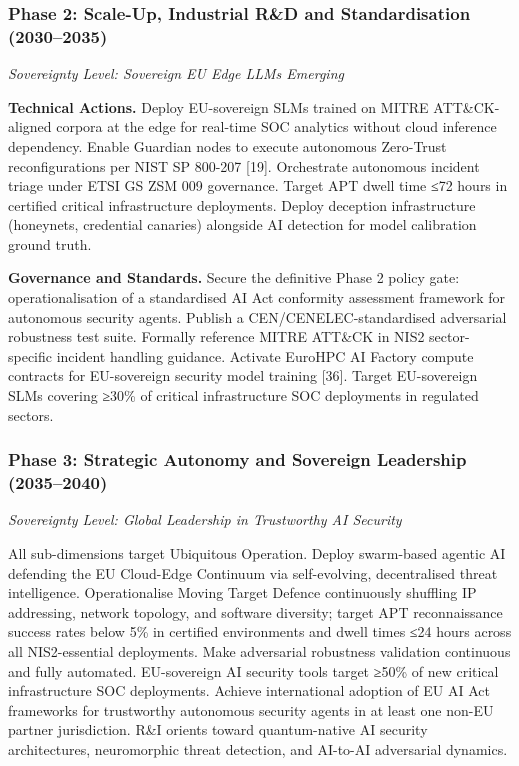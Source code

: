 \documentclass{ieeeaccess}
\begin{document}
\subsubsection{Phase 2: Scale-Up, Industrial R\&D and Standardisation
(2030--2035)}\label{phase-2-scale-up-industrial-rd-and-standardisation-20302035-1}

\emph{Sovereignty Level: Sovereign EU Edge LLMs Emerging}

\textbf{Technical Actions.} Deploy EU-sovereign SLMs trained on MITRE
ATT\&CK-aligned corpora at the edge for real-time SOC analytics without
cloud inference dependency. Enable Guardian nodes to execute autonomous
Zero-Trust reconfigurations per NIST SP 800-207 {[}19{]}. Orchestrate
autonomous incident triage under ETSI GS ZSM 009 governance. Target APT
dwell time ≤72 hours in certified critical infrastructure deployments.
Deploy deception infrastructure (honeynets, credential canaries)
alongside AI detection for model calibration ground truth.

\textbf{Governance and Standards.} Secure the definitive Phase 2 policy
gate: operationalisation of a standardised AI Act conformity assessment
framework for autonomous security agents. Publish a
CEN/CENELEC-standardised adversarial robustness test suite. Formally
reference MITRE ATT\&CK in NIS2 sector-specific incident handling
guidance. Activate EuroHPC AI Factory compute contracts for EU-sovereign
security model training {[}36{]}. Target EU-sovereign SLMs covering
≥30\% of critical infrastructure SOC deployments in regulated sectors.

\subsubsection{Phase 3: Strategic Autonomy and Sovereign Leadership
(2035--2040)}\label{phase-3-strategic-autonomy-and-sovereign-leadership-20352040-1}

\emph{Sovereignty Level: Global Leadership in Trustworthy AI Security}

All sub-dimensions target Ubiquitous Operation. Deploy swarm-based
agentic AI defending the EU Cloud-Edge Continuum via self-evolving,
decentralised threat intelligence. Operationalise Moving Target Defence
continuously shuffling IP addressing, network topology, and software
diversity; target APT reconnaissance success rates below 5\% in
certified environments and dwell times ≤24 hours across all
NIS2-essential deployments. Make adversarial robustness validation
continuous and fully automated. EU-sovereign AI security tools target
≥50\% of new critical infrastructure SOC deployments. Achieve
international adoption of EU AI Act frameworks for trustworthy
autonomous security agents in at least one non-EU partner jurisdiction.
R\&I orients toward quantum-native AI security architectures,
neuromorphic threat detection, and AI-to-AI adversarial dynamics.
\end{document}
